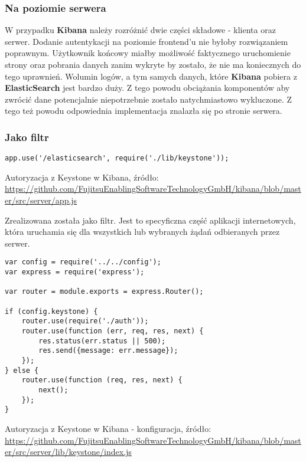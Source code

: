     \subsubsection{Na poziomie serwera}
    W przypadku \textbf{Kibana} należy rozróżnić dwie części składowe - klienta oraz serwer. Dodanie autentykacji
    na poziomie frontend'u nie byłoby rozwiązaniem poprawnym. Użytkownik końcowy miałby możliwość faktycznego
    uruchomienie strony oraz pobrania danych zanim wykryte by zostało, że nie ma koniecznych do tego uprawnień.
    Wolumin logów, a tym samych danych, które \textbf{Kibana} pobiera z \textbf{ElasticSearch} jest bardzo duży.
    Z tego powodu obciążania komponentów aby zwrócić dane potencjalnie niepotrzebnie zostało
    natychmiastowo wykluczone. Z tego też powodu odpowiednia implementacja znalazła się po stronie serwera.
    
    \subsubsection{Jako filtr}
    \begin{listing}
        \begin{verbatim}
app.use('/elasticsearch', require('./lib/keystone'));
        \end{verbatim}
        \label{chapter:application_own:own_work:kibana_and_keystone:filter_code}
        \caption[Autoryzacja z Keystone w Kibana]{Autoryzacja z Keystone w Kibana, źródło: \url{https://github.com/FujitsuEnablingSoftwareTechnologyGmbH/kibana/blob/master/src/server/app.js}}
    \end{listing}
    Zrealizowana została jako filtr. Jest to specyficzna część aplikacji internetowych, która
    uruchamia się dla wszystkich lub wybranych żądań odbieranych przez serwer.
    
    \begin{listing}
        \begin{verbatim}
var config = require('../../config');
var express = require('express');

var router = module.exports = express.Router();

if (config.keystone) {
    router.use(require('./auth'));
    router.use(function (err, req, res, next) {
        res.status(err.status || 500);
        res.send({message: err.message});
    });
} else {
    router.use(function (req, res, next) {
        next();
    });
}
        \end{verbatim}
        \label{chapter:application_own:own_work:kibana_and_keystone:filter_configuration}
        \caption[Autoryzacja z Keystone w Kibana - konfiguracja]{Autoryzacja z Keystone w Kibana - konfiguracja, źródło: \url{https://github.com/FujitsuEnablingSoftwareTechnologyGmbH/kibana/blob/master/src/server/lib/keystone/index.js}}
    \end{listing}
    
